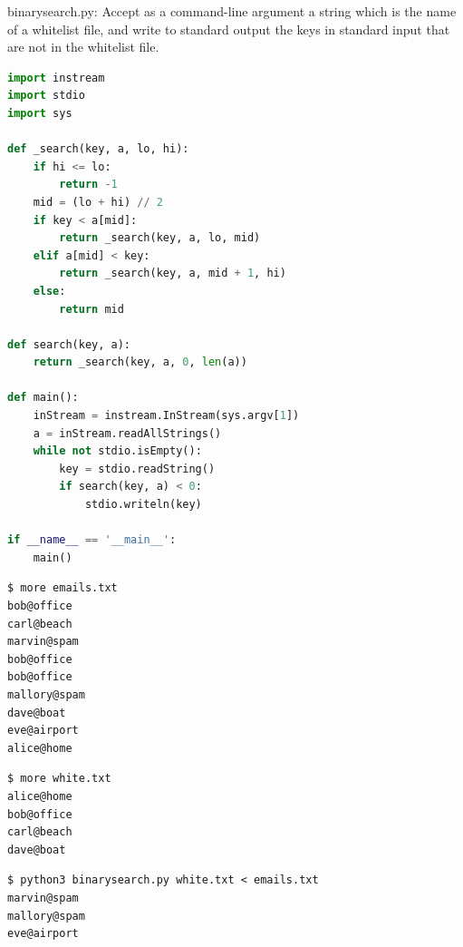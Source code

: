 \documentclass[8pt,a4paper,compress]{beamer}
\begin{document}
\begin{frame}[fragile]
\pause

\begin{framed}
\tiny binarysearch.py: Accept as a command-line argument a string which is the name of a whitelist file, and write to standard output the keys in standard input that are not in the whitelist file.
\end{framed}

\begin{lstlisting}[language=python,style=focusin]
import instream
import stdio
import sys

def _search(key, a, lo, hi):
    if hi <= lo:
        return -1
    mid = (lo + hi) // 2
    if key < a[mid]:
        return _search(key, a, lo, mid)
    elif a[mid] < key:
        return _search(key, a, mid + 1, hi)
    else:
        return mid

def search(key, a):
    return _search(key, a, 0, len(a))

def main():
    inStream = instream.InStream(sys.argv[1])
    a = inStream.readAllStrings()
    while not stdio.isEmpty():
        key = stdio.readString()
        if search(key, a) < 0:
            stdio.writeln(key)

if __name__ == '__main__':
    main()
\end{lstlisting}
\end{frame}

\begin{frame}[fragile]
\pause

\begin{lstlisting}[language={},style=focusin]
$ more emails.txt 
bob@office
carl@beach
marvin@spam
bob@office
bob@office
mallory@spam
dave@boat
eve@airport
alice@home
\end{lstlisting}

\pause

\begin{lstlisting}[language={},style=focusin]
$ more white.txt
alice@home
bob@office
carl@beach
dave@boat
\end{lstlisting}

\pause

\begin{lstlisting}[language={},style=focusin]
$ python3 binarysearch.py white.txt < emails.txt 
marvin@spam
mallory@spam
eve@airport
\end{lstlisting}
\end{frame}
\end{document}
